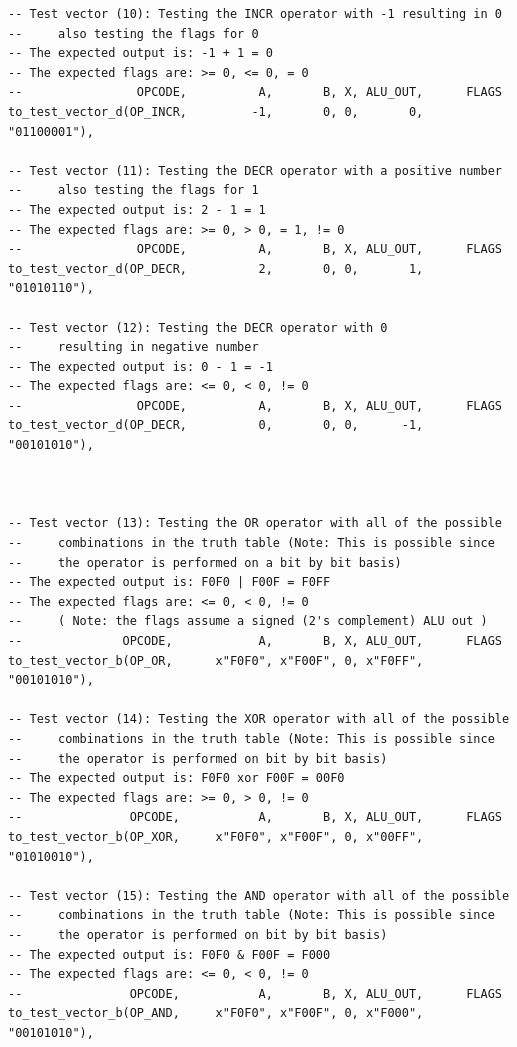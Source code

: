 \documentclass[10pt]{article}
\begin{document}
\begin{verbatim}
-- Test vector (10): Testing the INCR operator with -1 resulting in 0
--     also testing the flags for 0
-- The expected output is: -1 + 1 = 0
-- The expected flags are: >= 0, <= 0, = 0
--                OPCODE,          A,       B, X, ALU_OUT,      FLAGS
to_test_vector_d(OP_INCR,         -1,       0, 0,       0, "01100001"),

-- Test vector (11): Testing the DECR operator with a positive number
--     also testing the flags for 1
-- The expected output is: 2 - 1 = 1
-- The expected flags are: >= 0, > 0, = 1, != 0
--                OPCODE,          A,       B, X, ALU_OUT,      FLAGS
to_test_vector_d(OP_DECR,          2,       0, 0,       1, "01010110"),

-- Test vector (12): Testing the DECR operator with 0 
--     resulting in negative number
-- The expected output is: 0 - 1 = -1
-- The expected flags are: <= 0, < 0, != 0
--                OPCODE,          A,       B, X, ALU_OUT,      FLAGS
to_test_vector_d(OP_DECR,          0,       0, 0,      -1, "00101010"),



-- Test vector (13): Testing the OR operator with all of the possible 
--     combinations in the truth table (Note: This is possible since 
--     the operator is performed on a bit by bit basis)
-- The expected output is: F0F0 | F00F = F0FF 
-- The expected flags are: <= 0, < 0, != 0
--     ( Note: the flags assume a signed (2's complement) ALU out )
--              OPCODE,            A,       B, X, ALU_OUT,      FLAGS
to_test_vector_b(OP_OR,      x"F0F0", x"F00F", 0, x"F0FF", "00101010"),

-- Test vector (14): Testing the XOR operator with all of the possible 
--     combinations in the truth table (Note: This is possible since
--     the operator is performed on bit by bit basis)
-- The expected output is: F0F0 xor F00F = 00F0
-- The expected flags are: >= 0, > 0, != 0
--               OPCODE,           A,       B, X, ALU_OUT,      FLAGS
to_test_vector_b(OP_XOR,     x"F0F0", x"F00F", 0, x"00FF", "01010010"),

-- Test vector (15): Testing the AND operator with all of the possible 
--     combinations in the truth table (Note: This is possible since
--     the operator is performed on bit by bit basis)
-- The expected output is: F0F0 & F00F = F000
-- The expected flags are: <= 0, < 0, != 0
--               OPCODE,           A,       B, X, ALU_OUT,      FLAGS
to_test_vector_b(OP_AND,     x"F0F0", x"F00F", 0, x"F000", "00101010"),


\end{verbatim}
\end{document}
